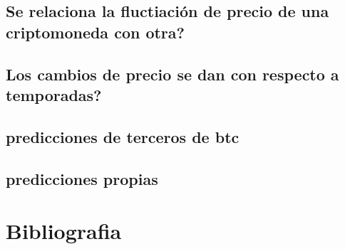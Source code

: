 \documentclass[12pt,letterpaper]{article}
\begin{document}
	\subsection*{Se relaciona la fluctiaci\'on de precio de una criptomoneda con otra?}
	\subsection*{Los cambios de precio se dan con respecto a temporadas?}
	\subsection*{predicciones de terceros de btc}
	\subsection*{predicciones propias}
	
\section{Bibliografia}
\end{document}
